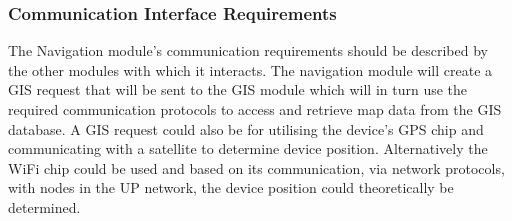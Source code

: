 \documentclass[11pt]{article}
\begin{document}
 \subsubsection{Communication Interface Requirements}
  
The Navigation module’s communication requirements should be described by the other modules with which it interacts. The navigation module will create a GIS request that will be sent to the GIS module which will in turn use the required communication protocols to access and retrieve map data from the GIS database. A GIS request could also be for utilising the device’s GPS chip and communicating with a satellite to determine device position. Alternatively the WiFi chip could be used and based on its communication, via network protocols, with nodes in the UP network, the device position could theoretically be determined.
\end{document}
